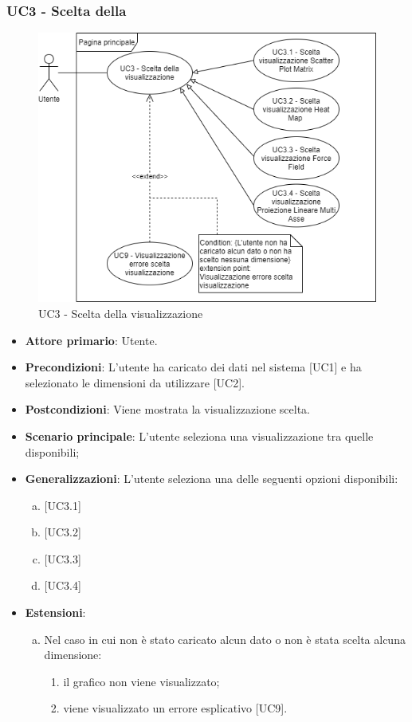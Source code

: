 \subsubsection{UC3 - Scelta della }
\begin{figure}[h]
\includegraphics[width=\linewidth]{section/Images/UC3.png}
\centering
\caption{UC3 - Scelta della visualizzazione}
\end{figure}
\begin{itemize}
	\item \textbf{Attore primario}: Utente.
	\item \textbf{Precondizioni}: L'utente ha caricato dei dati nel sistema [UC1] e ha selezionato le dimensioni da utilizzare [UC2].
	\item \textbf{Postcondizioni}: Viene mostrata la visualizzazione scelta.
	\item \textbf{Scenario principale}: L'utente seleziona una visualizzazione tra quelle disponibili;
	\item \textbf{Generalizzazioni}: L'utente seleziona una delle seguenti opzioni disponibili:
		\begin{enumerate}[(a)]
			\item {}
			\item {}
			\item {}
			\item {}
		\end{enumerate}
	\item \textbf{Estensioni}:
	\begin{enumerate}[(a)]
		\item Nel caso in cui non è stato caricato alcun dato o non è stata scelta alcuna dimensione:
		\begin{enumerate}[1.]
			\item il grafico non viene visualizzato;
			\item viene visualizzato un errore esplicativo [UC9].
		\end{enumerate}
	\end{enumerate}
\end{itemize}